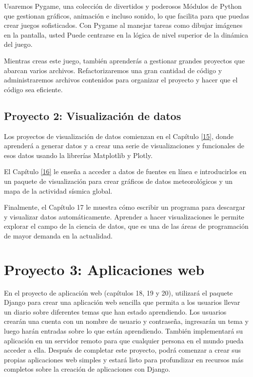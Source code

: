 {Usaremos Pygame, una colección de divertidos y poderosos Módulos de Python que gestionan gráficos,
animación e incluso sonido, lo que facilita para que puedas crear juegos sofisticados. 
Con Pygame al manejar tareas como dibujar imágenes en la pantalla, usted Puede centrarse en la lógica de nivel
superior de la dinámica del juego.

Mientras creas este juego, también aprenderás a gestionar grandes proyectos que abarcan varios archivos.
Refactorizaremos una gran cantidad de código y administraremos archivos contenidos para organizar el proyecto y hacer 
que el código sea eficiente.


\subsection*{Proyecto 2: Visualización de datos}

Los proyectos de visualización de datos comienzan en el Capítulo \ref{15}, donde aprenderá a generar datos y a crear una serie 
de visualizaciones  y funcionales de esos datos usando la librerías {\ttfamily Matplotlib} y  {\ttfamily Plotly}. 

El Capítulo \ref{16} le enseña a acceder a datos de fuentes en línea e introducirlos en un paquete de visualización para 
crear gráficos de datos meteorológicos y un mapa de la actividad sísmica global. 

Finalmente, el Capítulo 17 le muestra cómo escribir un programa para descargar y visualizar datos automáticamente. 
Aprender a hacer visualizaciones le permite explorar el campo de la ciencia de datos, que es una de las áreas de programación de mayor demanda en la actualidad.

\section*{Proyecto 3: Aplicaciones web}


En el proyecto de aplicación web (capítulos 18, 19 y 20), utilizará el paquete Django para crear una aplicación web sencilla que permita a los usuarios llevar un diario sobre diferentes temas que han estado aprendiendo. Los usuarios crearán una cuenta con un nombre de usuario y contraseña, ingresarán un tema y luego harán entradas sobre lo que están aprendiendo. 
También implementará su aplicación en un servidor remoto para que cualquier persona en el mundo pueda acceder a ella.
Después de completar este proyecto, podrá comenzar a crear sus propias aplicaciones web simples y estará listo para profundizar en recursos más completos sobre la creación de aplicaciones con Django.






}
